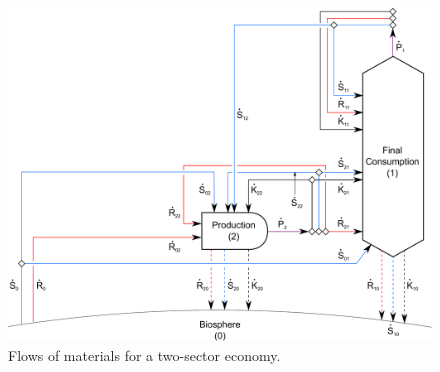 \begin{figure}[!ht]
\centering
\includegraphics[width=0.8\linewidth]{Part_1/Chapter_Materials/images/2_sector_materials.pdf}
\caption[Flows of materials for a two-sector economy]{Flows of materials for a two-sector economy.}
\label{fig:B_materials}
\end{figure}

